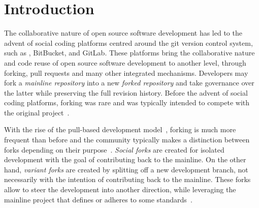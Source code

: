 \section{Introduction}
\label{sec:intro}

The collaborative nature of open source software development has led to the advent of social coding platforms centred around the git version control system, such as \gh, BitBucket, and GitLab.
These platforms bring the collaborative nature and code reuse of open source software development to another level, through forking, pull requests and many other integrated mechanisms.
Developers may fork a \textit{mainline repository} into a new \textit{forked repository} and take governance over the latter while preserving the full revision history.
Before the advent of social coding platforms, forking was rare and was typically intended to compete with the original project~\cite{Linus:2012Perspectives,Gregorio:2012,Viseur:2012Forks,Linus:2013CodeForking,Linus:2011ToFork,Gamalielsson:2014Sustainability}.

With the rise of the pull-based development model~\cite{Gousios:2014ICSE}, forking is much more frequent than before and the community typically makes a distinction between forks depending on their purpose~\cite{Zhou:2020}.
\textit{Social forks} are created for isolated development with the goal of contributing back to the mainline.
On the other hand, \textit{variant forks} are created by splitting off a new development branch, not necessarily with the intention of contributing back to the mainline.
These forks allow to steer the development into another direction, while leveraging the mainline project that defines or adheres to some standards~\cite{sung:ICSE:2020}.

